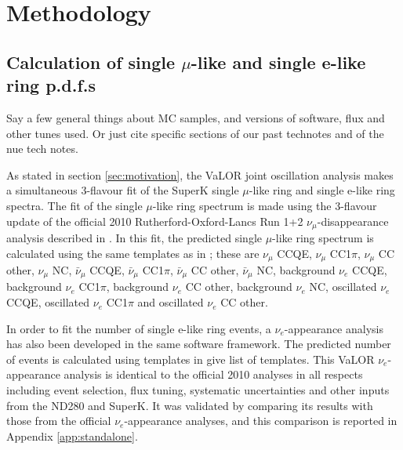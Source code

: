 
\section {Methodology}
\label{sec:description}


\subsection{Calculation of single $\mu$-like and single e-like ring p.d.f.s}
\label{sec:pdf_calculation}

{\color{red} 
Say a few general things about MC samples, and versions of software, flux and other tunes used. 
Or just cite specific sections of our past technotes and of the nue tech notes.

}

As stated in section \ref{sec:motivation}, the VaLOR joint oscillation analysis makes a simultaneous 3-flavour fit of the 
SuperK single $\mu$-like ring and single e-like ring spectra. The fit of the single $\mu$-like ring spectrum is made using 
the 3-flavour update of the official 2010 Rutherford-Oxford-Lancs Run 1+2 $\nu_{\mu}$-disappearance analysis described in 
\cite{OurRun1and2Analysis3F}. In this fit, the predicted single $\mu$-like ring spectrum is calculated using the same templates 
as in \cite{OurRun1and2Analysis3F}; these are $\nu_{\mu}$ CCQE, $\nu_{\mu}$ CC1$\pi$, $\nu_{\mu}$ CC other, $\nu_{\mu}$ NC, 
$\bar{\nu}_{\mu}$ CCQE, $\bar{\nu}_{\mu}$ CC1$\pi$, $\bar{\nu}_{\mu}$ CC other, $\bar{\nu}_{\mu}$ NC, background $\nu_{e}$ CCQE, 
background $\nu_{e}$ CC1$\pi$, background $\nu_{e}$ CC other, background $\nu_{e}$ NC, oscillated $\nu_{e}$ CCQE, oscillated 
$\nu_{e}$ CC1$\pi$ and oscillated $\nu_{e}$ CC other. 

In order to fit the number of single e-like ring events, a $\nu_{e}$-appearance analysis has also been developed in the same 
software framework. The predicted number of events is calculated using templates in {\color{red} give list of templates}.
This VaLOR $\nu_{e}$-appearance analysis is identical to the official 2010 analyses \cite{NueRun1Analysis, NueRun1and2Analysis} 
in all respects including event selection, flux tuning, systematic uncertainties and other inputs from the ND280 and SuperK. 
It was validated by comparing its results with those from the official $\nu_{e}$-appearance analyses, and this comparison is 
reported in Appendix \ref{app:standalone}.

